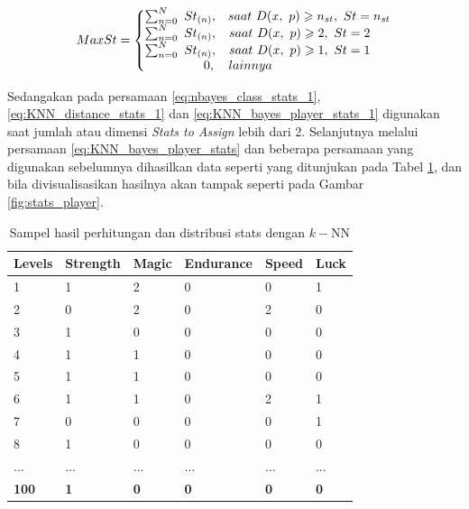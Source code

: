 \begin{equation}\label{eq:KNN_bayes_player_stats_1}
\begin{split}
MaxSt = \left\{\begin{matrix}
\sum_{n = 0}^{N}\ St_{(n)}, & saat\ D(x,\ p) \geqslant n_{st},\ St = n_{st} \\
\sum_{n = 0}^{N}\ St_{(n)}, & \hspace{-1.5em}saat\ D(x,\ p) \geqslant 2,\ St = 2 \\
\sum_{n = 0}^{N}\ St_{(n)}, & \hspace{-1.5em}saat\ D(x,\ p) \geqslant 1,\ St = 1 \\
\hspace{4.5em} 0, 			& \hspace{-9.3em} lainnya
\end{matrix}\right.
\end{split}
\end{equation}

Sedangakan pada persamaan \ref{eq:nbayes_class_stats_1}, \ref{eq:KNN_distance_stats_1} dan \ref{eq:KNN_bayes_player_stats_1} digunakan saat jumlah atau dimensi \textit{Stats to Assign} lebih dari 2. Selanjutnya melalui persamaan \ref{eq:KNN_bayes_player_stats} dan beberapa persamaan yang digunakan sebelumnya dihasilkan data seperti yang ditunjukan pada Tabel \ref{tb:player_battle_stats}, dan bila divisualisasikan hasilnya akan tampak seperti pada Gambar \ref{fig:stats_player}.
\vspace{1ex}

\begin{table}[!h]
	\centering
	\caption{Sampel hasil perhitungan dan distribusi stats dengan $k-$NN}
	\label{tb:player_battle_stats}
	\begin{tabular}{|l|l|l|l|l|l|}
		\hline
		\rowcolor[HTML]{C0C0C0} 
		\textbf{Levels} & \textbf{Strength} & \textbf{Magic} & \textbf{Endurance} & \textbf{Speed} & \textbf{Luck} \\ \hline
		1 & 1 & 2 & 0 & 0 & 1 \\ \hline
		2 & 0 & 2 & 0 & 2 & 0 \\ \hline
		3 & 1 & 0 & 0 & 0 & 0 \\ \hline
		4 & 1 & 1 & 0 & 0 & 0 \\ \hline
		5 & 1 & 1 & 0 & 0 & 0 \\ \hline
		6 & 1 & 1 & 0 & 2 & 1 \\ \hline
		7 & 0 & 0 & 0 & 0 & 1 \\ \hline
		8 & 1 & 0 & 0 & 0 & 0 \\ \hline
		... & ... & ... & ... & ... & ... \\ \hline
		\textbf{100} & \textbf{1} & \textbf{0} & \textbf{0} & \textbf{0} & \textbf{0} \\ \hline
	\end{tabular}
\end{table}
\vspace{1ex}

